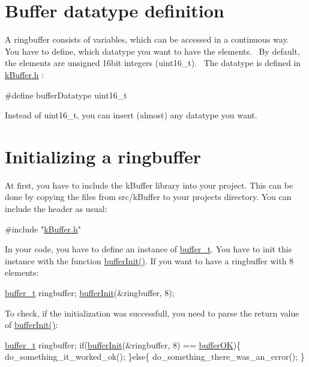 \hypertarget{fundamental_usage_datatype}{}\section{Buffer datatype definition}\label{fundamental_usage_datatype}
A ringbuffer consists of variables, which can be accessed in a continuous way.~\newline
 You have to define, which datatype you want to have the elements.~\newline
 By default, the elements are unsigned 16bit integers (uint16\+\_\+t).~\newline
 The datatype is defined in \hyperlink{k_buffer_8h}{k\+Buffer.\+h} \+: 
\begin{DoxyCode}
\textcolor{preprocessor}{#define bufferDatatype uint16\_t}
\end{DoxyCode}
 Instead of uint16\+\_\+t, you can insert (almost) any datatype you want. \hypertarget{fundamental_usage_init}{}\section{Initializing a ringbuffer}\label{fundamental_usage_init}
At first, you have to include the k\+Buffer library into your project. This can be done by copying the files from src/k\+Buffer to your project\textquotesingle{}s directory. You can include the header as usual\+: 
\begin{DoxyCode}
\textcolor{preprocessor}{#include "\hyperlink{k_buffer_8h}{kBuffer.h}"}
\end{DoxyCode}
 In your code, you have to define an instance of \hyperlink{structbuffer__t}{buffer\+\_\+t}. You have to init this instance with the function \hyperlink{k_buffer_8c_aec18d6ea571b1326dbeb7ca15f4969c0}{buffer\+Init()}. If you want to have a ringbuffer with 8 elements\+: 
\begin{DoxyCode}
\hyperlink{structbuffer__t}{buffer\_t} ringbuffer;
\hyperlink{k_buffer_8c_aec18d6ea571b1326dbeb7ca15f4969c0}{bufferInit}(&ringbuffer, 8);
\end{DoxyCode}
 To check, if the initialization was successfull, you need to parse the return value of \hyperlink{k_buffer_8c_aec18d6ea571b1326dbeb7ca15f4969c0}{buffer\+Init()}\+: 
\begin{DoxyCode}
\hyperlink{structbuffer__t}{buffer\_t} ringbuffer;
\textcolor{keywordflow}{if}(\hyperlink{k_buffer_8c_aec18d6ea571b1326dbeb7ca15f4969c0}{bufferInit}(&ringbuffer, 8) == \hyperlink{k_buffer_8h_a7a0bf550b7bd49d85172e409c0034fe6a69e32851bd2f089b06555decd80aac1b}{bufferOK})\{
 do\_something\_it\_worked\_ok();
\}\textcolor{keywordflow}{else}\{
 do\_something\_there\_was\_an\_error();
\}
\end{DoxyCode}
